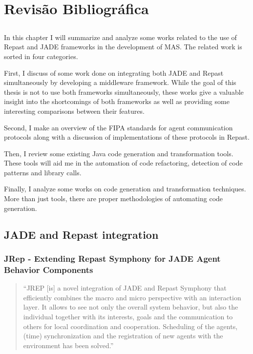 \chapter{Revisão Bibliográfica} \label{chap:sota}

\section*{}



In this chapter I will summarize and analyze some works related to the use of Repast and JADE frameworks in the development of MAS. The related
work is sorted in four categories.

First, I discuss of some work done on integrating both JADE and Repast simultaneously by developing a middleware framework.  While the goal of this thesis is not to use both frameworks simultaneously, these works give a valuable insight into the shortcomings of both frameworks as well as providing some interesting comparisons between their features.

Second, I make an overview of the FIPA standards for agent communication protocols along with a discussion of implementations of these protocols in Repast.

Then, I review some existing Java code generation and transformation tools. These tools will aid me in the automation of code refactoring, detection of code patterns and library calls.

Finally, I analyze some works on code generation and transformation techniques.
More than just tools, there are proper methodologies of automating code generation.

\section{JADE and Repast integration}

\subsection{
	JRep - Extending Repast Symphony for JADE Agent Behavior Components}
\begin{quote}
	``JREP [is] a novel integration of JADE and Repast Symphony that efficiently combines the macro and micro perspective with an interaction layer. It allows to see not only the overall system behavior, but also the individual together with its interests, goals and the communication to
	others for local coordination and cooperation. Scheduling of the agents, (time) synchronization and the registration of new agents with the environment has been solved.'' \cite{gormer2011jrep}
\end{quote}

